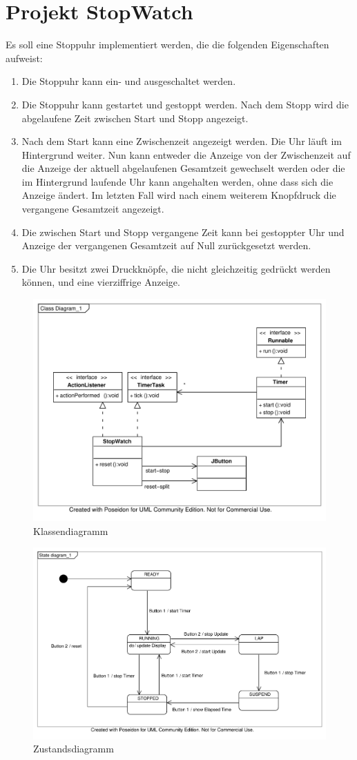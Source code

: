 \documentclass[a4paper,utf,ngerman]{article}
\begin{document}
\section*{Projekt StopWatch}
Es soll eine Stoppuhr implementiert werden, die 
die folgenden Eigenschaften aufweist:
\begin{enumerate}
  \item Die Stoppuhr kann ein- und ausgeschaltet werden.
  \item Die Stoppuhr kann gestartet und gestoppt werden. Nach dem
  Stopp wird die abgelaufene Zeit zwischen Start und Stopp angezeigt.
  \item Nach dem Start kann eine Zwischenzeit angezeigt werden.
   Die Uhr läuft im Hintergrund weiter. Nun kann entweder die
   Anzeige von der Zwischenzeit auf die Anzeige 
   der aktuell abgelaufenen Gesamtzeit gewechselt werden
   oder die im Hintergrund laufende Uhr kann angehalten werden,
   ohne dass sich die Anzeige ändert. Im letzten Fall
   wird nach einem weiterem Knopfdruck die vergangene 
  Gesamtzeit angezeigt.
  \item Die zwischen Start und Stopp vergangene Zeit kann
   bei gestoppter Uhr und Anzeige der vergangenen Gesamtzeit
   auf Null zurückgesetzt werden.
 \item Die Uhr besitzt zwei Druckknöpfe, die nicht gleichzeitig
  gedrückt werden können, und eine vierziffrige Anzeige.
\end{enumerate}
\begin{figure}[H]
\centering
\includegraphics[trim=20 60 50 40,width=\linewidth,clip=true]{ClassDiagram}
\caption{Klassendiagramm}
\end{figure}
\begin{figure}[H]
\includegraphics[trim=20 40 60 40,width=\linewidth,clip=true]{Statediagram}
\caption{Zustandsdiagramm}
\end{figure}
\end{document}
